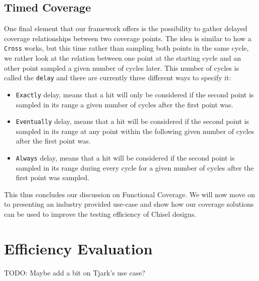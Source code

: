 \documentclass[conference]{IEEEtran}
\newcommand{\todo}[1]{{\color{olive} TODO: #1}}
\begin{document}
\subsection{Timed Coverage}
One final element that our framework offers is the possibility to gather delayed coverage relationships between two coverage points. The idea is similar to how a \texttt{Cross} works, but this time rather than sampling both points in the same cycle, we rather look at the relation between one point at the starting cycle and an other point sampled a given number of cycles later. This number of cycles is called the \texttt{delay} and there are currently three different ways to specify it:  
\begin{itemize}
 \item \texttt{Exactly} delay, means that a hit will only be considered if the second point is sampled in its range a given number of cycles after the first point was.
 \item \texttt{Eventually} delay, means that a hit will be considered if the second point is sampled in its range at any point within the following given number of cycles after the first point was.  
 \item \texttt{Always} delay, means that a hit will be considered if the second point is sampled in its range during every cycle for a given number of cycles after the first point was sampled.
\end{itemize}  

This thus concludes our discussion on Functional Coverage. We will now move on to presenting an industry provided use-case and show how our coverage solutions can be used to improve the testing efficiency of Chisel designs.

\section{Efficiency Evaluation}
\todo{Maybe add a bit on Tjark's use case?}
\end{document}
